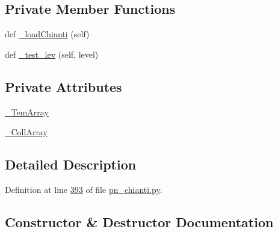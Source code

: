 \subsection*{Private Member Functions}
\begin{DoxyCompactItemize}
\item 
def \hyperlink{classpyneb_1_1utils_1_1pn__chianti_1_1___coll_chianti_a5dd1e03e0086123159b7ca3144bf6ea7}{\+\_\+load\+Chianti} (self)
\item 
def \hyperlink{classpyneb_1_1utils_1_1pn__chianti_1_1___coll_chianti_ab0418def377c8054aded2bfb3055a40f}{\+\_\+test\+\_\+lev} (self, level)
\end{DoxyCompactItemize}
\subsection*{Private Attributes}
\begin{DoxyCompactItemize}
\item 
\hyperlink{classpyneb_1_1utils_1_1pn__chianti_1_1___coll_chianti_a7dc1ede29c8b436a27a20203cdb87f49}{\+\_\+\+Tem\+Array}
\item 
\hyperlink{classpyneb_1_1utils_1_1pn__chianti_1_1___coll_chianti_a5cdf912f3bcbf25bcbbba1ba8fc072d9}{\+\_\+\+Coll\+Array}
\end{DoxyCompactItemize}


\subsection{Detailed Description}


Definition at line \hyperlink{pn__chianti_8py_source_l00393}{393} of file \hyperlink{pn__chianti_8py_source}{pn\+\_\+chianti.\+py}.



\subsection{Constructor \& Destructor Documentation}
\hypertarget{classpyneb_1_1utils_1_1pn__chianti_1_1___coll_chianti_acfefab5b5e07e3204550565ea2b26ceb}{}
